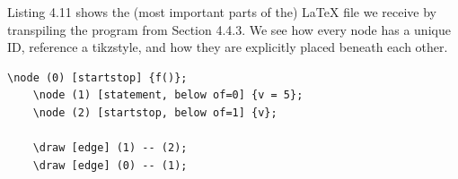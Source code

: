 Listing 4.11 shows the (most important parts of the) LaTeX file we receive by transpiling the program from Section 4.4.3. We see how every node has a unique ID, reference a tikzstyle, and how they are explicitly placed beneath each other. \hfill \\

\begin{lstlisting}[caption={The LaTeX from transpiling a program to IBP}, captionpos=b, frame=trbl]
    \node (0) [startstop] {f()};
    \node (1) [statement, below of=0] {v = 5};
    \node (2) [startstop, below of=1] {v};

    \draw [edge] (1) -- (2);
    \draw [edge] (0) -- (1);
\end{lstlisting}